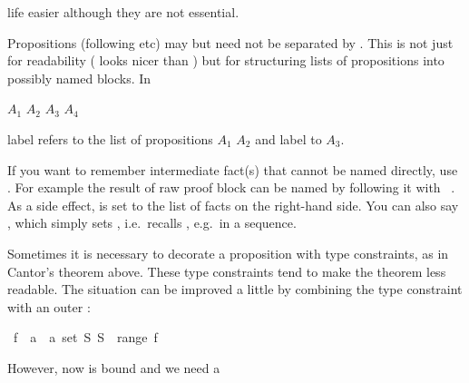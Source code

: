 \begin{isabellebody}
\begin{isamarkuptext}
life easier although they are not essential.%
\end{isamarkuptext}%
\isamarkuptrue%
%
\isamarkuptrue%
%
\begin{isamarkuptext}%
Propositions (following  etc) may but need not be
separated by . This is not just for readability
(    looks nicer than
  ) but for structuring lists of propositions
into possibly named blocks. In
\begin{center}
  $A_1$ $A_2$   $A_3$
 $A_4$
\end{center}
label  refers to the list of propositions $A_1$ $A_2$ and
label  to $A_3$.%
\end{isamarkuptext}%
\isamarkuptrue%
%
\isamarkuptrue%
%
\begin{isamarkuptext}%
If you want to remember intermediate fact(s) that cannot be
named directly, use . For example the result of raw
proof block can be named by following it with
~.  As a side effect,
 is set to the list of facts on the right-hand side. You
can also say , which simply sets ,
i.e.\ recalls , e.g.\ in a  sequence.%
\end{isamarkuptext}%
\isamarkuptrue%
%
\isamarkuptrue%
%
\begin{isamarkuptext}%
Sometimes it is necessary to decorate a proposition with type
constraints, as in Cantor's theorem above. These type constraints tend
to make the theorem less readable. The situation can be improved a
little by combining the type constraint with an outer \isa{{\isasymAnd}}:%
\end{isamarkuptext}%
\isamarkupfalse%
\ {\isachardoublequote}{\isasymAnd}f\ {\isacharcolon}{\isacharcolon}\ {\isacharprime}a\ {\isasymRightarrow}\ {\isacharprime}a\ set{\isachardot}\ {\isasymexists}S{\isachardot}\ S\ {\isasymnotin}\ range\ f{\isachardoublequote}%
\isadelimproof
%
\endisadelimproof
%
\isatagproof
%
\endisatagproof
{\isafoldproof}%
%
\isadelimproof
%
\endisadelimproof
\isamarkuptrue%
%
\begin{isamarkuptext}%
\noindent However, now  is bound and we need a

\end{isamarkuptext}
\end{isabellebody}
